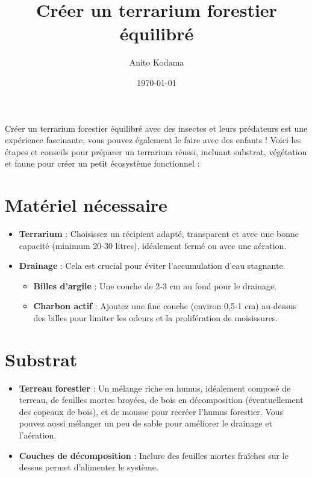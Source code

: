 
\usepackage[utf8]{inputenc}
\usepackage{enumitem}

\title{Créer un terrarium forestier équilibré}
\author{Anito Kodama}
\date{\today}



\maketitle

Créer un terrarium forestier équilibré avec des insectes et leurs prédateurs est une expérience fascinante, vous pouvez également le faire avec des enfants ! Voici les étapes et conseils pour préparer un terrarium réussi, incluant substrat, végétation et faune pour créer un petit écosystème fonctionnel :

\section{Matériel nécessaire}
\begin{itemize}
    \item \textbf{Terrarium} : Choisissez un récipient adapté, transparent et avec une bonne capacité (minimum 20-30 litres), idéalement fermé ou avec une aération.
    \item \textbf{Drainage} : Cela est crucial pour éviter l'accumulation d'eau stagnante.
    \begin{itemize}
        \item \textbf{Billes d'argile} : Une couche de 2-3 cm au fond pour le drainage.
        \item \textbf{Charbon actif} : Ajoutez une fine couche (environ 0,5-1 cm) au-dessus des billes pour limiter les odeurs et la prolifération de moisissures.
    \end{itemize}
\end{itemize}

\section{Substrat}
\begin{itemize}
    \item \textbf{Terreau forestier} : Un mélange riche en humus, idéalement composé de terreau, de feuilles mortes broyées, de bois en décomposition (éventuellement des copeaux de bois), et de mousse pour recréer l'humus forestier. Vous pouvez aussi mélanger un peu de sable pour améliorer le drainage et l'aération.
    \item \textbf{Couches de décomposition} : Inclure des feuilles mortes fraîches sur le dessus permet d'alimenter le système.
\end{itemize}

